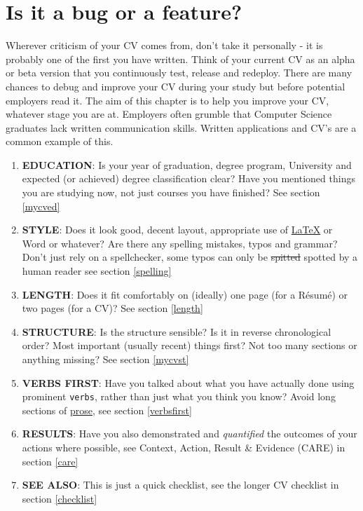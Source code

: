 \documentclass[
]{book}
\providecommand{\tightlist}{%
  \setlength{\itemsep}{0pt}\setlength{\parskip}{0pt}}
\begin{document}
\hypertarget{mycv}{%
\section{Is it a bug or a feature?}\label{mycv}}

Wherever criticism of your CV comes from, don't take it personally - it is probably one of the first you have written. Think of your current CV as an alpha or beta version that you continuously test, release and redeploy. There are many chances to debug and improve your CV during your study but before potential employers read it. The aim of this chapter is to help you improve your CV, whatever stage you are at. Employers often grumble that Computer Science graduates lack written communication skills. Written applications and CV's are a common example of this.

\begin{enumerate}
\def\labelenumi{\arabic{enumi}.}
\tightlist
\item
  \textbf{EDUCATION}: Is your year of graduation, degree program, University and expected (or achieved) degree classification clear? Have you mentioned things you are studying now, not just courses you have finished? See section \ref{mycved}
\item
  \textbf{STYLE}: Does it look good, decent layout, appropriate use of \href{https://latex4year1.netlify.app/}{LaTeX} or Word or whatever? Are there any spelling mistakes, typos and grammar? Don't just rely on a spellchecker, some typos can only be \sout{spitted} spotted by a human reader see section \ref{spelling}
\item
  \textbf{LENGTH}: Does it fit comfortably on (ideally) one page (for a Résumé) or two pages (for a CV)? See section \ref{length}
\item
  \textbf{STRUCTURE}: Is the structure sensible? Is it in reverse chronological order? Most important (usually recent) things first? Not too many sections or anything missing? See section \ref{mycvst}
\item
  \textbf{VERBS FIRST}: Have you talked about what you have actually done using prominent \texttt{verbs}, rather than just what you think you know? Avoid long sections of \href{https://en.wikipedia.org/wiki/Prose}{prose}, see section \ref{verbsfirst}
\item
  \textbf{RESULTS}: Have you also demonstrated and \emph{quantified} the outcomes of your actions where possible, see Context, Action, Result \& Evidence (CARE) in section \ref{care}
\item
  \textbf{SEE ALSO}: This is just a quick checklist, see the longer CV checklist in section \ref{checklist}
\end{enumerate}
\end{document}
